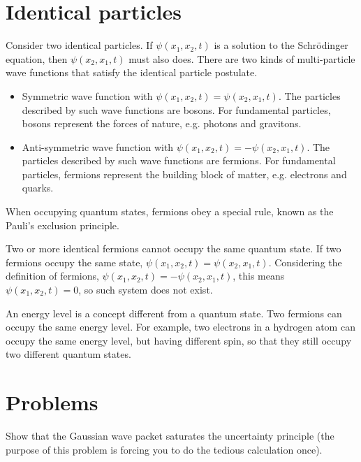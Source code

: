 \documentclass[12pt]{book} %
\numberwithin{equation}{chapter}
\begin{document}
\section{Identical particles}
Consider two identical particles. If $\psi(x_{1}, x_{2}, t)$ is a solution to the Schr\"{o}dinger equation, then $\psi(x_{2}, x_{1}, t)$ must also does.\bigskip\newline
There are two kinds of multi-particle wave functions that satisfy the identical particle postulate.
\begin{itembox}
\begin{itemize}
    \item Symmetric wave function with $\psi(x_{1}, x_{2}, t)=\psi(x_{2}, x_{1}, t)$. The particles described by such wave functions are bosons. For fundamental particles, bosons represent the forces of nature, e.g. photons and gravitons.
    \item Anti-symmetric wave function with $\psi(x_{1}, x_{2}, t)=-\psi(x_{2}, x_{1}, t)$. The particles described by such wave functions are fermions. For fundamental particles, fermions represent the building block of matter, e.g. electrons and quarks.
\end{itemize}
\end{itembox}
When occupying quantum states, fermions obey a special rule, known as the Pauli's exclusion principle.
\begin{theorem}
Two or more identical fermions cannot occupy the same quantum state.\bigskip\newline
If two fermions occupy the same state, $\psi(x_{1}, x_{2}, t)=\psi(x_{2}, x_{1}, t)$. Considering the definition of fermions, $\psi(x_{1}, x_{2}, t)=-\psi(x_{2}, x_{1}, t)$, this means $\psi(x_{1}, x_{2}, t)=0$, so such system does not exist.
\end{theorem}
An energy level is a concept different from a quantum state. Two fermions can occupy the same energy level. For example, two electrons in a hydrogen atom can occupy the same energy level, but having different spin, so that they still occupy two different quantum states.

\section*{Problems}
\begin{problem}
Show that the Gaussian wave packet saturates the uncertainty principle (the purpose of this problem is forcing you to do the tedious calculation once).
\end{problem}
\end{document}
